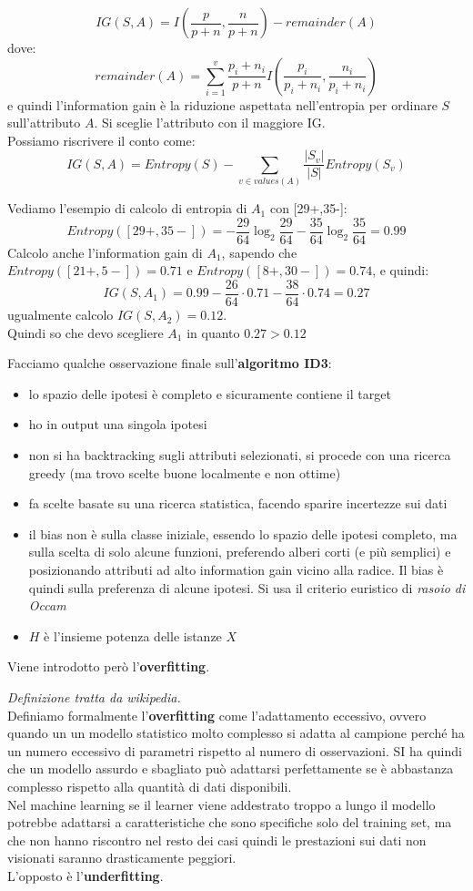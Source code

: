\documentclass[a4paper,12pt, oneside]{book}
\begin{document}
\[IG(S,A)=I\left(\frac{p}{p+n},\frac{n}{p+n}\right)-remainder(A)\]
dove:
\[remainder(A)=\sum_{i=1}^v \frac{p_i+n_i}{p+n}
  I\left(\frac{p_i}{p_i+n_i},\frac{n_i}{p_i+n_i}\right)\]
e quindi l'information gain è la riduzione aspettata nell'entropia per ordinare
$S$ sull'attributo $A$. Si sceglie l'attributo con il maggiore IG.\\
Possiamo riscrivere il conto come:
\[IG(S,A)=Entropy(S)-\sum_{v\in values(A)}\frac{|S_v|}{|S|}Entropy(S_v)\]
\begin{esempio}
  Vediamo l'esempio di calcolo di entropia di $A_1$ con [29+,35-]:
  \[Entropy([29+,35-])=
    -\frac{29}{64}\log_2\frac{29}{64}-\frac{35}{64}\log_2\frac{35}{64}=0.99\]
  Calcolo anche l'information gain di $A_1$, sapendo che
  $Entropy([21+,5-])=0.71$ e $Entropy([8+,30-])=0.74$,
  e quindi:
  \[IG(S,A_1)=0.99-\frac{26}{64}\cdot 0.71-\frac{38}{64}\cdot 0.74=0.27\]
  ugualmente calcolo $IG(S,A_2)=0.12$. \\
  Quindi so che devo scegliere $A_1$ in quanto $0.27 > 0.12$
\end{esempio}
Facciamo qualche osservazione finale sull'\textbf{algoritmo ID3}:
\begin{itemize}
  \item lo spazio delle ipotesi è completo e sicuramente contiene il target
  \item ho in output una singola ipotesi
  \item non si ha backtracking sugli attributi selezionati, si procede con una
  ricerca greedy (ma trovo scelte buone localmente e non ottime)
  \item fa scelte basate su una ricerca statistica, facendo sparire incertezze
  sui dati
  \item il bias non è sulla classe iniziale, essendo lo spazio delle ipotesi
  completo, ma sulla scelta di solo alcune funzioni, preferendo alberi corti (e
  più semplici) e posizionando attributi ad alto information gain vicino alla
  radice. Il bias è quindi sulla preferenza di alcune ipotesi. Si usa il
  criterio euristico di \textit{rasoio di Occam}
  \item $H$ è l'insieme potenza delle istanze $X$
\end{itemize}
Viene introdotto però l'\textbf{overfitting}.
\begin{definizione}
  \textit{Definizione tratta da wikipedia.}\\
  Definiamo formalmente l'\textbf{overfitting} come l'adattamento eccessivo,
  ovvero quando 
  un un modello statistico molto complesso si adatta al campione perché ha un
  numero eccessivo di parametri rispetto al numero di osservazioni. SI ha
  quindi che un modello assurdo e sbagliato può adattarsi perfettamente se è
  abbastanza complesso rispetto alla quantità di dati disponibili.\\
  Nel machine learning se il learner viene addestrato troppo a lungo il modello
  potrebbe adattarsi a caratteristiche che sono specifiche solo del training
  set, ma che non hanno riscontro nel resto dei casi quindi le prestazioni sui
  dati non visionati saranno drasticamente peggiori.\\
  L'opposto è l'\textbf{underfitting}.
\end{definizione}
\end{document}

